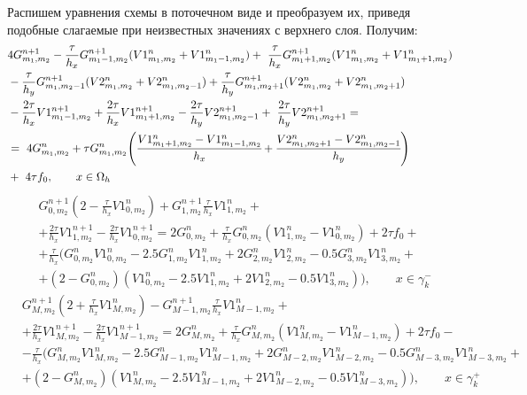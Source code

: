 Распишем уравнения схемы в поточечном виде и преобразуем их, приведя подобные слагаемые при неизвестных значениях с верхнего слоя. Получим:
\begin{align*}
& 4 G_{m_1,m_2}^{n+1}  -\frac{\tau}{h_x}  G_{m_1-1,m_2}^{n+1}(V1_{m_1,m_2}^n + V1_{m_1-1,m_2}^n) +\ \frac{\tau}{h_x} G_{m_1+1,m_2}^{n+1}(V1_{m_1,m_2}^n + V1_{m_1+1,m_2}^n)\\
& -\frac{\tau}{h_y} G_{m_1,m_2-1}^{n+1}(V2_{m_1,m_2}^n + V2_{m_1,m_2-1}^n)
 + \frac{\tau}{h_y} G_{m_1,m_2+1}^{n+1}(V2_{m_1,m_2}^n + V2_{m_1,m_2+1}^n)\\
& -\frac{2\tau}{h_x} V1_{m_1-1,m_2}^{n+1} + \frac{2\tau}{h_x} V1_{m_1+1,m_2}^{n+1}
-\frac{2\tau}{h_y} V2_{m_1,m_2-1}^{n+1} +\ \frac{2\tau}{h_y} V2_{m_1,m_2+1}^{n+1} = \\
& =\ 4 G_{m_1,m_2}^n + \tau G_{m_1,m_2}^n 
\Bigg(\cfrac{V1_{m_1+1,m_2}^n - V1_{m_1-1,m_2}^n}{h_x} +  \cfrac{V2_{m_1,m_2+1}^n - V2_{m_1,m_2-1}^n}{h_y}\Bigg) \\
& +\ 4\tau f_0, \qquad x\in \Omega _h
\end{align*}
\begin{align*}
& G_{0,m_2}^{n+1}(2 - \frac{\tau}{h_x}V1_{0,m_2}^n) + G_{1,m_2}^{n+1}\frac{\tau}{h_x}V1_{1,m_2}^n + \\
& + \frac{2\tau}{h_x}V1_{1,m_2}^{n+1} - \frac{2\tau}{h_x}V1_{0,m_2}^{n+1} = 
  2 G_{0,m_2}^n + \frac{\tau}{h_x} G_{0,m_2}^n (V1_{1,m_2}^n - V1_{0,m_2}^n) + 2\tau f_0 +\\
& + \frac{\tau}{h_x} \Big( G_{0,m_2}^n V1_{0,m_2}^n - 2.5 G_{1,m_2}^n V1_{1,m_2}^n 
  + 2 G_{2,m_2}^n V1_{2,m_2}^n - 0.5 G_{3,m_2}^n V1_{3,m_2}^n + \\
& + (2 - G_{0,m_2}^n)
  (V1_{0,m_2}^n - 2.5 V1_{1,m_2}^n + 2 V1_{2,m_2}^n - 0.5 V1_{3,m_2}^n) \Big), \qquad x \in \gamma_k^-
\end{align*}
\begin{align*}
& G_{M,m_2}^{n+1}(2 + \frac{\tau}{h_x}V1_{M,m_2}^n) - G_{M-1,m_2}^{n+1}\frac{\tau}{h_x}V1_{M-1,m_2}^n + \\
& + \frac{2\tau}{h_x}V1_{M,m_2}^{n+1} - \frac{2\tau}{h_x}V1_{M-1,m_2}^{n+1} = 
  2 G_{M,m_2}^n + \frac{\tau}{h_x} G_{M,m_2}^n (V1_{M,m_2}^n - V1_{M-1,m_2}^n) + 2\tau f_0 -\\
& - \frac{\tau}{h_x} \Big( G_{M,m_2}^n V1_{M,m_2}^n - 2.5 G_{M-1,m_2}^n V1_{M-1,m_2}^n 
  + 2 G_{M-2,m_2}^n V1_{M-2,m_2}^n - 0.5 G_{M-3,m_2}^n V1_{M-3,m_2}^n + \\
& + (2 - G_{M,m_2}^n)
  (V1_{M,m_2}^n - 2.5 V1_{M-1,m_2}^n + 2 V1_{M-2,m_2}^n - 0.5 V1_{M-3,m_2}^n) \Big), \qquad x \in \gamma_k^+
\end{align*}
